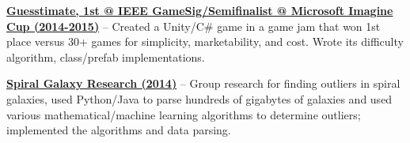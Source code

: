 \documentclass[letterpaper,MMMyyyy,nonstopmode]{simpleresumecv}
\begin{document}
\begin{Body}
	\Entry
	\href{https://github.com/brendonwai/PAS}
	{\textbf{Guesstimate, 1st @ IEEE GameSig/Semifinalist @ Microsoft Imagine Cup (2014-2015)}} -- Created a Unity/C\# game in a game jam that won 1st place versus 30+ games for simplicity, marketability, and cost. Wrote its difficulty algorithm, class/prefab implementations.\newline

	\Entry
	\href{https://github.com/SVT125/Research-CS199}
	{\textbf{Spiral Galaxy Research (2014)}} -- Group research for finding outliers in spiral galaxies, used Python/Java to parse hundreds of gigabytes of galaxies and used various mathematical/machine learning algorithms to determine outliers; implemented the algorithms and data parsing.\newline

\end{Body}
\end{document}
